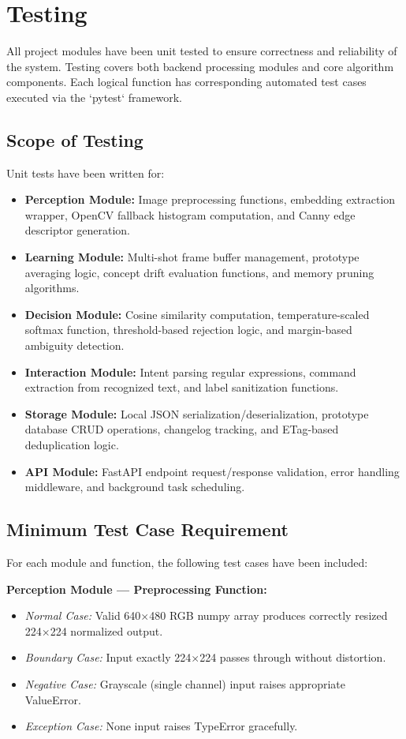 \documentclass[12pt,a4paper]{report}
\begin{document}
\section{Testing}
All project modules have been unit tested to ensure correctness and reliability of the system. Testing covers both backend processing modules and core algorithm components. Each logical function has corresponding automated test cases executed via the `pytest` framework.

\subsection{Scope of Testing}
Unit tests have been written for:
\begin{itemize}
    \item \textbf{Perception Module:} Image preprocessing functions, embedding extraction wrapper, OpenCV fallback histogram computation, and Canny edge descriptor generation.
    \item \textbf{Learning Module:} Multi-shot frame buffer management, prototype averaging logic, concept drift evaluation functions, and memory pruning algorithms.
    \item \textbf{Decision Module:} Cosine similarity computation, temperature-scaled softmax function, threshold-based rejection logic, and margin-based ambiguity detection.
    \item \textbf{Interaction Module:} Intent parsing regular expressions, command extraction from recognized text, and label sanitization functions.
    \item \textbf{Storage Module:} Local JSON serialization/deserialization, prototype database CRUD operations, changelog tracking, and ETag-based deduplication logic.
    \item \textbf{API Module:} FastAPI endpoint request/response validation, error handling middleware, and background task scheduling.
\end{itemize}

\subsection{Minimum Test Case Requirement}
For each module and function, the following test cases have been included:

\textbf{Perception Module --- Preprocessing Function:}
\begin{itemize}
    \item \textit{Normal Case:} Valid 640$\times$480 RGB numpy array produces correctly resized 224$\times$224 normalized output.
    \item \textit{Boundary Case:} Input exactly 224$\times$224 passes through without distortion.
    \item \textit{Negative Case:} Grayscale (single channel) input raises appropriate ValueError.
    \item \textit{Exception Case:} None input raises TypeError gracefully.
\end{itemize}
\end{document}
